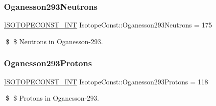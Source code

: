 \subsubsection{\texorpdfstring{Oganesson293\+Neutrons}{Oganesson293Neutrons}}
{\footnotesize\ttfamily \mbox{\hyperlink{group___isotope_const-_macros_ga5f18360b3e99483a35c32d789e62621c}{I\+S\+O\+T\+O\+P\+E\+C\+O\+N\+S\+T\+\_\+\+I\+NT}} Isotope\+Const\+::\+Oganesson293\+Neutrons = 175}

\$ \$ Neutrons in Oganesson-\/293. \mbox{\label{group___isotope_const-_oganesson-_og293_ga5a2761d4324cf25a3816a219de7347c4}} 
\subsubsection{\texorpdfstring{Oganesson293\+Protons}{Oganesson293Protons}}
{\footnotesize\ttfamily \mbox{\hyperlink{group___isotope_const-_macros_ga5f18360b3e99483a35c32d789e62621c}{I\+S\+O\+T\+O\+P\+E\+C\+O\+N\+S\+T\+\_\+\+I\+NT}} Isotope\+Const\+::\+Oganesson293\+Protons = 118}

\$ \$ Protons in Oganesson-\/293. 